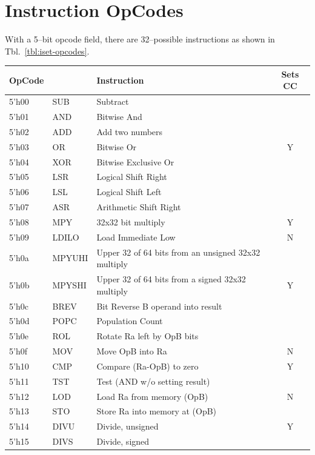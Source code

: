 \documentclass{gqtekspec}
\begin{document}
\section{Instruction OpCodes}
With a 5--bit opcode field, there are 32--possible instructions as shown in 
Tbl.~\ref{tbl:iset-opcodes}.
\begin{table}\begin{center}
\begin{tabular}{|l|l|l|c|} \hline \rowcolor[gray]{0.85}
OpCode & & Instruction &Sets CC \\\hline\hline
5'h00 & SUB & Subtract &   \\\cline{1-3}
5'h01 & AND & Bitwise And &   \\\cline{1-3}
5'h02 & ADD & Add two numbers &   \\\cline{1-3}
5'h03 & OR  & Bitwise Or & Y \\\cline{1-3}
5'h04 & XOR & Bitwise Exclusive Or &   \\\cline{1-3}
5'h05 & LSR & Logical Shift Right &   \\\cline{1-3}
5'h06 & LSL & Logical Shift Left &   \\\cline{1-3}
5'h07 & ASR & Arithmetic Shift Right &   \\\hline
5'h08 & MPY & 32x32 bit multiply & Y \\\hline
5'h09 & LDILO & Load Immediate Low & N\\\hline
5'h0a & MPYUHI & Upper 32 of 64 bits from an unsigned 32x32 multiply &  \\\cline{1-3}
5'h0b & MPYSHI & Upper 32 of 64 bits from a signed 32x32 multiply & Y \\\cline{1-3}
5'h0c & BREV & Bit Reverse B operand into result&  \\\cline{1-3}
5'h0d & POPC& Population Count &  \\\cline{1-3}
5'h0e & ROL & Rotate Ra left by OpB bits&   \\\hline
5'h0f & MOV & Move OpB into Ra & N \\\hline
5'h10 & CMP & Compare (Ra-OpB) to zero & Y \\\cline{1-3}
5'h11 & TST & Test (AND w/o setting result) &   \\\hline
5'h12 & LOD & Load Ra from memory (OpB) & N \\\cline{1-3}
5'h13 & STO & Store Ra into memory at (OpB) &  \\\hline\hline
5'h14 & DIVU & Divide, unsigned & Y \\\cline{1-3}
5'h15 & DIVS & Divide, signed &  \\\hline\hline

\end{tabular}
\end{center}
\end{table}
\end{document}
